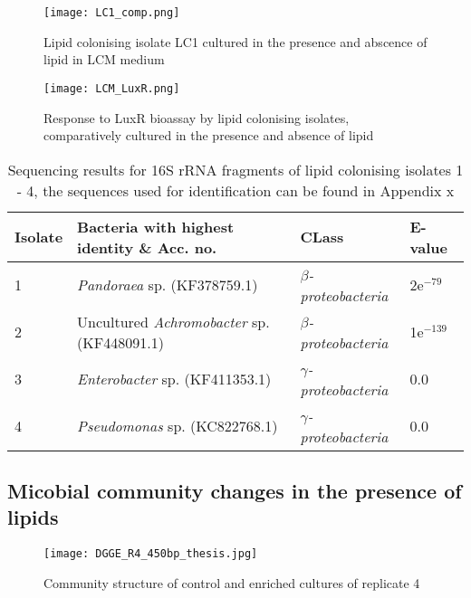 \documentclass[11pt]{article}
\begin{document}
\begin{figure}
\texttt{[image: LC1\_comp.png]}
\caption{Lipid colonising isolate LC1 cultured in the presence and abscence of lipid in LCM medium}
\end{figure}

\begin{figure}
\texttt{[image: LCM\_LuxR.png]}
\caption{Response to LuxR bioassay by lipid colonising isolates, comparatively cultured in the presence and absence of lipid }
\end{figure}


\begin{sidewaystable}[!htbp]
\begin{tabular}{ | l | p{9cm} | p{4.5cm} | l | }
\hline
Isolate & Bacteria with highest identity \& Acc. no. & CLass & E-value \\
\hline
1 &  \emph{Pandoraea} sp. (KF378759.1) & \emph{$\beta$-proteobacteria} & 2e$^{-79}$ \\
\hline
2 & Uncultured \emph{Achromobacter} sp. (KF448091.1) & \emph{$\beta$-proteobacteria} & 1e$^{-139}$ \\
\hline
3 & \emph{Enterobacter} sp. (KF411353.1) & \emph{$\gamma$-proteobacteria} & 0.0 \\
\hline
4 & \emph{Pseudomonas} sp. (KC822768.1) & \emph{$\gamma$-proteobacteria} & 0.0 \\
\hline
\end{tabular}
\caption{Sequencing results for 16S rRNA fragments of lipid colonising isolates 1 - 4, the sequences used for identification can be found in Appendix x}
\end{sidewaystable}

\subsection{Micobial community changes in the presence of lipids}

\begin{figure}
\texttt{[image: DGGE\_R4\_450bp\_thesis.jpg]}
\caption{Community structure of control and enriched cultures of replicate 4}
\end{figure}
\end{document}

